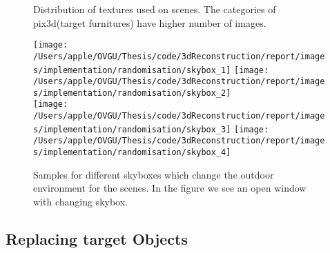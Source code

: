 
\begin{figure}[!ht]
    \centering
    \resizebox{\textwidth}{!}{}
    \caption{Distribution of textures used on scenes. The categories of pix3d(target furnitures) have higher number of images.}
    \label{fig:Distribution of textures}
\end{figure}

\begin{figure}
    \centering
        \texttt{[image: /Users/apple/OVGU/Thesis/code/3dReconstruction/report/images/implementation/randomisation/skybox\_1]}
        \texttt{[image: /Users/apple/OVGU/Thesis/code/3dReconstruction/report/images/implementation/randomisation/skybox\_2]} \\
        \vspace{0.1cm}
        \texttt{[image: /Users/apple/OVGU/Thesis/code/3dReconstruction/report/images/implementation/randomisation/skybox\_3]}
        \texttt{[image: /Users/apple/OVGU/Thesis/code/3dReconstruction/report/images/implementation/randomisation/skybox\_4]}\\
    \caption{Samples for different skyboxes which change the outdoor environment for the scenes. In the figure we see an open window with changing skybox.}
    \label{fig:skybox samples}
\end{figure}

\subsection{Replacing target Objects}\label{subsec:replacing-target-objects}

